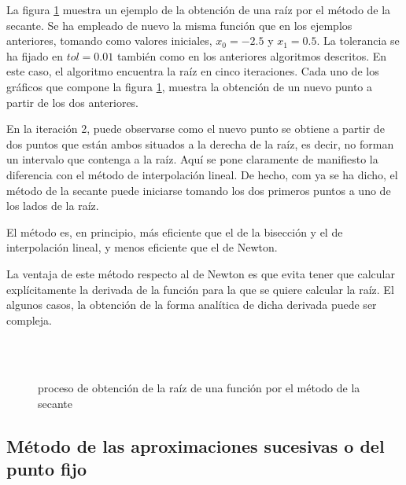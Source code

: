La figura \ref{fig:secante3} muestra un ejemplo de la obtención de una raíz por el método de la secante. Se ha empleado de nuevo la misma función que en los ejemplos anteriores, tomando como valores iniciales, $x_0=-2.5$ y $x_1=0.5$. La tolerancia se ha fijado en $tol=0.01$ también como en los anteriores algoritmos descritos. En este caso, el algoritmo encuentra la raíz en cinco iteraciones. Cada uno de los gráficos que compone la figura \ref{fig:secante3}, muestra la obtención de un nuevo punto a partir de los dos anteriores. 

En la iteración 2, puede observarse como el nuevo punto se obtiene a partir de dos puntos que están ambos situados a la derecha de la raíz, es decir, no forman un intervalo que contenga a la raíz.  Aquí se pone claramente de manifiesto la diferencia con el método de interpolación lineal. De hecho, com ya se ha dicho, el método de la secante puede iniciarse tomando los dos primeros puntos a uno de los lados de la raíz.

 El método es, en principio, más eficiente que el de la bisección y el de interpolación lineal, y menos eficiente que el de Newton.

La ventaja de este método respecto al de Newton es que evita tener que calcular explícitamente la derivada de la función para la que se quiere calcular la raíz. El algunos casos, la obtención de la forma analítica de dicha derivada puede ser compleja.   

\begin{figure}
\centering
{} \qquad
{}\\
\qquad
{}\\
\qquad
{}

\caption{proceso de obtención de la raíz de una función por el método de la secante}
\label{fig:secante3}
\end{figure}

\subsection{Método de las aproximaciones sucesivas o del punto fijo}\label{pfijo}

